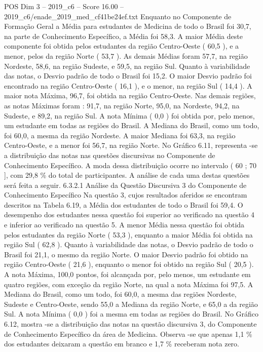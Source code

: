 \begin{textsample}{POS Dim 3 – 2019\_c6 – Score 16.00 – 2019\_c6/enade\_2019\_med\_cf41be24ef.txt}
Enquanto no Componente de Formação Geral a Média para estudantes de Medicina de todo o Brasil foi 30,7, na parte de Conhecimento Específico, a Média foi 58,3.
A maior Média deste componente foi obtida pelos estudantes da região Centro-Oeste ( 60,5 ), e a menor, pelos da região Norte ( 53,7 ).
As demais Médias foram 57,7, na região Nordeste, 58,6, na região Sudeste, e 59,5, na região Sul.
Quanto à variabilidade das notas, o Desvio padrão de todo o Brasil foi 15,2.
O maior Desvio padrão foi encontrado na região Centro-Oeste ( 16,1 ), e o menor, na região Sul ( 14,4 ).
A maior nota Máxima, 96,7, foi obtida na região Centro-Oeste.
Nas demais regiões, as notas Máximas foram : 91,7, na região Norte, 95,0, na Nordeste, 94,2, na Sudeste, e 89,2, na região Sul.
A nota Mínima ( 0,0 ) foi obtida por, pelo menos, um estudante em todas as regiões do Brasil.
A Mediana do Brasil, como um todo, foi 60,0, a mesma da região Nordeste.
A maior Mediana foi 63,3, na região Centro-Oeste, e a menor foi 56,7, na região Norte.
No Gráfico 6.11, representa -se a distribuição das notas nas questões discursivas no Componente de Conhecimento Específico.
A moda dessa distribuição ocorre no intervalo ( 60 ; 70 ], com 29,8 \% do total de participantes.
A análise de cada uma destas questões será feita a seguir. 6.3.2.1 Análise da Questão Discursiva 3 do Componente de Conhecimento Específico Na questão 3, cujos resultados aferidos se encontram descritos na Tabela 6.19, a Média dos estudantes de todo o Brasil foi 59,4.
O desempenho dos estudantes nessa questão foi superior ao verificado na questão 4 e inferior ao verificado na questão 5.
A menor Média nessa questão foi obtida pelos estudantes da região Norte ( 53,3 ), enquanto a maior Média foi obtida na região Sul ( 62,8 ).
Quanto à variabilidade das notas, o Desvio padrão de todo o Brasil foi 21,1, o mesmo da região Norte.
O maior Desvio padrão foi obtido na região Centro-Oeste ( 21,6 ), enquanto o menor foi obtido na região Sul ( 20,5 ).
A nota Máxima, 100,0 pontos, foi alcançada por, pelo menos, um estudante em quatro regiões, com exceção da região Norte, na qual a nota Máxima foi 97,5.
A Mediana do Brasil, como um todo, foi 60,0, a mesma das regiões Nordeste, Sudeste e Centro-Oeste, sendo 55,0 a Mediana da região Norte, e 65,0 a da região Sul.
A nota Mínima ( 0,0 ) foi a mesma em todas as regiões do Brasil.
No Gráfico 6.12, mostra -se a distribuição das notas na questão discursiva 3, do Componente de Conhecimento Específico da área de Medicina.
Observa -se que apenas 1,1 \% dos estudantes deixaram a questão em branco e 1,7 \% receberam nota zero.

\end{textsample}
